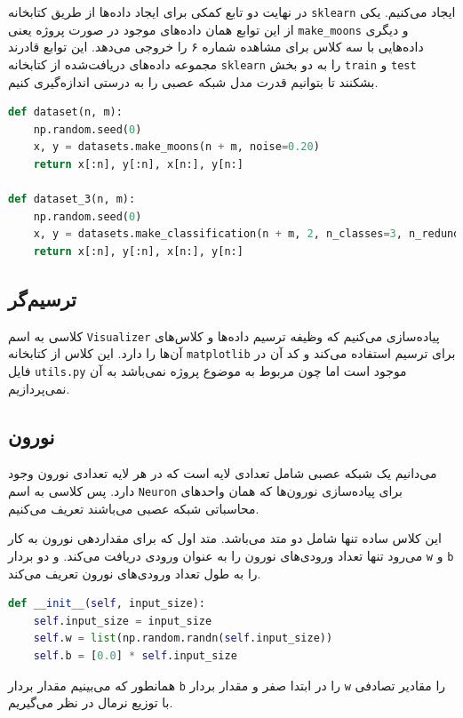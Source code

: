 \documentclass[a4paper, 12pt]{article}
\theoremstyle{definition}
\begin{document}
در نهایت دو تابع کمکی برای ایجاد داده‌ها از طریق کتابخانه
\texttt{sklearn}
ایجاد می‌کنیم. یکی از این توابع همان داده‌های موجود در صورت پروژه یعنی
\texttt{make\_moons}
و دیگری داده‌هایی با سه کلاس برای مشاهده شماره ۶ را خروجی می‌دهد. این توابع قادرند مجموعه داده‌های دریافت‌شده از کتابخانه
\texttt{sklearn}
را به دو بخش
\texttt{train}
و
\texttt{test}
بشکنند تا بتوانیم قدرت مدل شبکه عصبی را به درستی اندازه‌گیری کنیم.

\LTR
\begin{lstlisting}[language=Python]
def dataset(n, m):
    np.random.seed(0)
    x, y = datasets.make_moons(n + m, noise=0.20)
    return x[:n], y[:n], x[n:], y[n:]

def dataset_3(n, m):
    np.random.seed(0)
    x, y = datasets.make_classification(n + m, 2, n_classes=3, n_redundant=0, n_clusters_per_class=1)
    return x[:n], y[:n], x[n:], y[n:]
\end{lstlisting}
\RTL

\subsection{ترسیم‌گر}
کلاسی به اسم
\texttt{Visualizer}
پیاده‌سازی می‌کنیم که وظیفه ترسیم داده‌ها و کلاس‌های آن‌ها را دارد. این کلاس از کتابخانه
\texttt{matplotlib}
برای ترسیم استفاده می‌کند و کد آن در فایل
\texttt{utils.py}
موجود است اما چون مربوط به موضوع پروژه نمی‌باشد به آن نمی‌پردازیم.

\subsection{نورون}
می‌دانیم یک شبکه عصبی شامل تعدادی لایه است که در هر لایه تعدادی نورون وجود دارد. پس کلاسی به اسم
\texttt{Neuron}
برای پیاده‌سازی نورون‌ها که همان واحدهای محاسباتی شبکه عصبی می‌باشند تعریف می‌کنیم.

این کلاس ساده تنها شامل دو متد می‌باشد. متد اول که برای مقداردهی نورون به کار می‌رود تنها تعداد ورودی‌های نورون را به عنوان ورودی دریافت می‌کند. و دو بردار
\texttt{w}
و
\texttt{b}
را به طول تعداد ورودی‌های نورون تعریف می‌کند.

\LTR
\begin{lstlisting}[language=Python]
def __init__(self, input_size):
    self.input_size = input_size
    self.w = list(np.random.randn(self.input_size))
    self.b = [0.0] * self.input_size
\end{lstlisting}
\RTL

همانطور که می‌بینیم مقدار بردار
\texttt{b}
را در ابتدا صفر و مقدار بردار
\texttt{w}
را مقادیر تصادفی با توزیع نرمال در نظر می‌گیریم.
\end{document}
